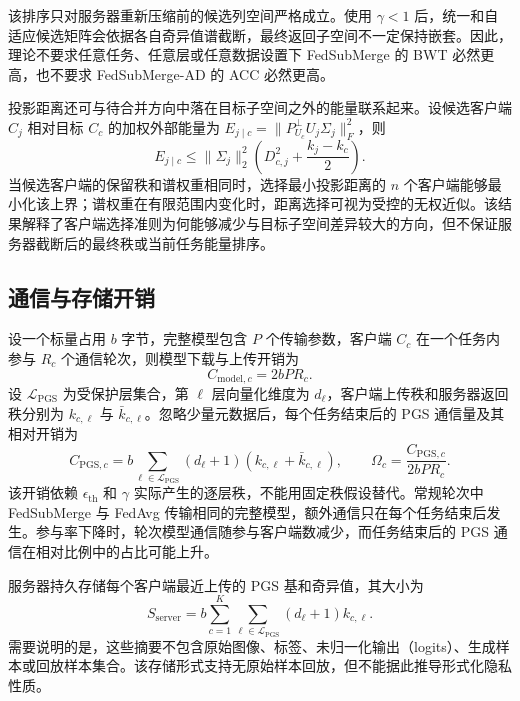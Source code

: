 该排序只对服务器重新压缩前的候选列空间严格成立。使用 $\gamma<1$ 后，统一和自适应候选矩阵会依据各自奇异值谱截断，最终返回子空间不一定保持嵌套。因此，理论不要求任意任务、任意层或任意数据设置下 FedSubMerge 的 BWT 必然更高，也不要求 FedSubMerge-AD 的 ACC 必然更高。

投影距离还可与待合并方向中落在目标子空间之外的能量联系起来。设候选客户端 $C_j$ 相对目标 $C_c$ 的加权外部能量为
$E_{j\mid c}=\|P_{U_c}^{\perp}U_j\Sigma_j\|_F^2$，则
\begin{equation}
E_{j\mid c}
\leq
\|\Sigma_j\|_2^2
\left(
D_{c,j}^2+\frac{k_j-k_c}{2}
\right).
\label{eq:fedsubmerge-peer-energy-bound}
\end{equation}
当候选客户端的保留秩和谱权重相同时，选择最小投影距离的 $n$ 个客户端能够最小化该上界；谱权重在有限范围内变化时，距离选择可视为受控的无权近似。该结果解释了客户端选择准则为何能够减少与目标子空间差异较大的方向，但不保证服务器截断后的最终秩或当前任务能量排序。

\subsection{通信与存储开销}
\label{subsec:fedsubmerge-theory-communication}

设一个标量占用 $b$ 字节，完整模型包含 $P$ 个传输参数，客户端 $C_c$ 在一个任务内参与 $R_c$ 个通信轮次，则模型下载与上传开销为
\begin{equation}
C_{\mathrm{model},c}=2bPR_c.
\label{eq:fedsubmerge-model-communication}
\end{equation}
设 $\mathcal{L}_{\mathrm{PGS}}$ 为受保护层集合，第 $\ell$ 层向量化维度为 $d_{\ell}$，客户端上传秩和服务器返回秩分别为 $k_{c,\ell}$ 与 $\bar k_{c,\ell}$。忽略少量元数据后，每个任务结束后的 PGS 通信量及其相对开销为
\begin{equation}
C_{\mathrm{PGS},c}
=
b\sum_{\ell\in\mathcal{L}_{\mathrm{PGS}}}
(d_{\ell}+1)(k_{c,\ell}+\bar k_{c,\ell}),
\qquad
\Omega_c
=
\frac{C_{\mathrm{PGS},c}}{2bPR_c}.
\label{eq:fedsubmerge-pgs-communication}
\end{equation}
该开销依赖 $\epsilon_{\mathrm{th}}$ 和 $\gamma$ 实际产生的逐层秩，不能用固定秩假设替代。常规轮次中 FedSubMerge 与 FedAvg 传输相同的完整模型，额外通信只在每个任务结束后发生。参与率下降时，轮次模型通信随参与客户端数减少，而任务结束后的 PGS 通信在相对比例中的占比可能上升。

服务器持久存储每个客户端最近上传的 PGS 基和奇异值，其大小为
\begin{equation}
S_{\mathrm{server}}
=
b\sum_{c=1}^{K}
\sum_{\ell\in\mathcal{L}_{\mathrm{PGS}}}
(d_{\ell}+1)k_{c,\ell}.
\label{eq:fedsubmerge-server-storage}
\end{equation}
需要说明的是，这些摘要不包含原始图像、标签、未归一化输出（logits）、生成样本或回放样本集合。该存储形式支持无原始样本回放，但不能据此推导形式化隐私性质。

